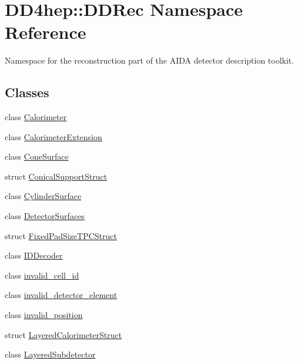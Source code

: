 \hypertarget{namespace_d_d4hep_1_1_d_d_rec}{}\section{D\+D4hep\+:\+:D\+D\+Rec Namespace Reference}
\label{namespace_d_d4hep_1_1_d_d_rec}


Namespace for the reconstruction part of the A\+I\+DA detector description toolkit.  


\subsection*{Classes}
\begin{DoxyCompactItemize}
\item 
class \hyperlink{class_d_d4hep_1_1_d_d_rec_1_1_calorimeter}{Calorimeter}
\item 
class \hyperlink{class_d_d4hep_1_1_d_d_rec_1_1_calorimeter_extension}{Calorimeter\+Extension}
\item 
class \hyperlink{class_d_d4hep_1_1_d_d_rec_1_1_cone_surface}{Cone\+Surface}
\item 
struct \hyperlink{struct_d_d4hep_1_1_d_d_rec_1_1_conical_support_struct}{Conical\+Support\+Struct}
\item 
class \hyperlink{class_d_d4hep_1_1_d_d_rec_1_1_cylinder_surface}{Cylinder\+Surface}
\item 
class \hyperlink{class_d_d4hep_1_1_d_d_rec_1_1_detector_surfaces}{Detector\+Surfaces}
\item 
struct \hyperlink{struct_d_d4hep_1_1_d_d_rec_1_1_fixed_pad_size_t_p_c_struct}{Fixed\+Pad\+Size\+T\+P\+C\+Struct}
\item 
class \hyperlink{class_d_d4hep_1_1_d_d_rec_1_1_i_d_decoder}{I\+D\+Decoder}
\item 
class \hyperlink{class_d_d4hep_1_1_d_d_rec_1_1invalid__cell__id}{invalid\+\_\+cell\+\_\+id}
\item 
class \hyperlink{class_d_d4hep_1_1_d_d_rec_1_1invalid__detector__element}{invalid\+\_\+detector\+\_\+element}
\item 
class \hyperlink{class_d_d4hep_1_1_d_d_rec_1_1invalid__position}{invalid\+\_\+position}
\item 
struct \hyperlink{struct_d_d4hep_1_1_d_d_rec_1_1_layered_calorimeter_struct}{Layered\+Calorimeter\+Struct}
\item 
class \hyperlink{class_d_d4hep_1_1_d_d_rec_1_1_layered_subdetector}{Layered\+Subdetector}
\item 

\end{DoxyCompactItemize}
